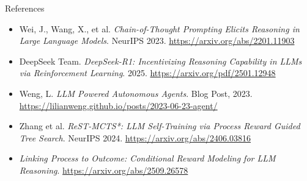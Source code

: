 \documentclass[aspectratio=169,11pt]{beamer}
\newcommand{\tightitems}{\setlength{\itemsep}{0.25em}\setlength{\parskip}{0pt}}
\begin{document}
\begin{frame}{References}
\small
\begin{itemize}\tightitems
  \item [1] Wei, J., Wang, X., et al. \textit{Chain-of-Thought Prompting Elicits Reasoning in Large Language Models}. NeurIPS 2023. \url{https://arxiv.org/abs/2201.11903}

  \item [2] DeepSeek Team. \textit{DeepSeek-R1: Incentivizing Reasoning Capability in LLMs via Reinforcement Learning}. 2025. \url{https://arxiv.org/pdf/2501.12948}

  \item [3] Weng, L. \textit{LLM Powered Autonomous Agents}. Blog Post, 2023. \url{https://lilianweng.github.io/posts/2023-06-23-agent/}

  \item [4] Zhang et al. \textit{ReST-MCTS*: LLM Self-Training via Process Reward Guided Tree Search}. NeurIPS 2024. \url{https://arxiv.org/abs/2406.03816}

  \item [5] \textit{Linking Process to Outcome: Conditional Reward Modeling for LLM Reasoning}. \url{https://arxiv.org/abs/2509.26578}
\end{itemize}
\end{frame}
\end{document}
